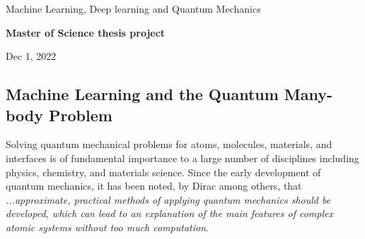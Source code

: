 \documentclass[%
oneside,                 %
final,                   %
10pt]{article}
\begin{document}

\newcommand{\exercisesection}[1]{\subsection*{#1}}






\thispagestyle{empty}

\begin{center}
{\LARGE\bf
\begin{spacing}{1.25}
Machine Learning, Deep learning and Quantum Mechanics
\end{spacing}
}
\end{center}


\begin{center}
{\bf Master of Science thesis project${}^{}$} \\ [0mm]
\end{center}

\begin{center}
\end{center}
    

\begin{center}
Dec 1, 2022
\end{center}

\vspace{1cm}


\subsection*{Machine Learning and the Quantum Many-body Problem}

Solving quantum mechanical problems for atoms,  molecules, materials, and
interfaces is of fundamental importance to a large number of
disciplines including physics, chemistry, and materials science. Since
the early development of quantum mechanics, it has been noted, by
Dirac among others, that \emph{...approximate, practical methods of applying quantum mechanics should be developed, which can lead to an explanation of the main features of complex atomic systems without too much computation}. 
\end{document}
